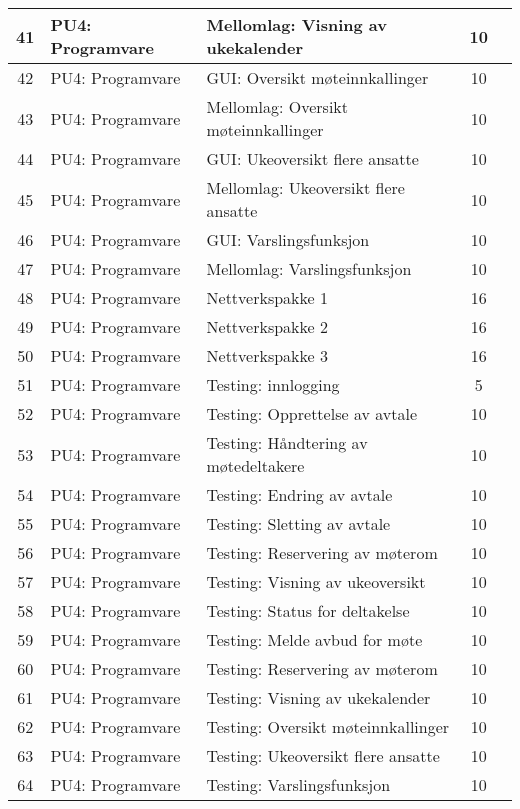 \begin{table}
{\begin{tabularx}{1.3\textwidth}{|c|l|X|c|c|}
	41 & PU4: Programvare & Mellomlag: Visning av ukekalender  & 10 & \\ \hline
	42 & PU4: Programvare & GUI: Oversikt møteinnkallinger & 10 & \\ \hline
	43 & PU4: Programvare & Mellomlag: Oversikt møteinnkallinger  & 10 & \\ \hline
	44 & PU4: Programvare & GUI: Ukeoversikt flere ansatte & 10 & \\ \hline
	45 & PU4: Programvare & Mellomlag: Ukeoversikt flere ansatte  & 10 & \\ \hline
	46 & PU4: Programvare & GUI: Varslingsfunksjon & 10 & \\ \hline
	47 & PU4: Programvare & Mellomlag: Varslingsfunksjon & 10 & \\ \hline
	48 & PU4: Programvare & Nettverkspakke 1 & 16 & \\ \hline
	49 & PU4: Programvare & Nettverkspakke 2 & 16 & \\ \hline
	50 & PU4: Programvare & Nettverkspakke 3 & 16 & \\ \hline
	51 & PU4: Programvare & Testing: innlogging & 5 & \\ \hline
	52 & PU4: Programvare & Testing: Opprettelse av avtale & 10 & \\ \hline
	53 & PU4: Programvare & Testing: Håndtering av møtedeltakere & 10 & \\ \hline
	54 & PU4: Programvare & Testing: Endring av avtale & 10 & \\  \hline
	55 & PU4: Programvare & Testing: Sletting av avtale & 10 & \\ \hline
	56 & PU4: Programvare & Testing: Reservering av møterom & 10 & \\ \hline
	57 & PU4: Programvare & Testing: Visning av ukeoversikt & 10 & \\ \hline
	58 & PU4: Programvare & Testing: Status for deltakelse & 10 & \\ \hline
	59 & PU4: Programvare & Testing: Melde avbud for møte & 10 & \\ \hline
	60 & PU4: Programvare & Testing: Reservering av møterom & 10 & \\ \hline
	61 & PU4: Programvare & Testing: Visning av ukekalender & 10 & \\ \hline
	62 & PU4: Programvare & Testing: Oversikt møteinnkallinger & 10 & \\ \hline
	63 & PU4: Programvare & Testing: Ukeoversikt flere ansatte & 10 & \\ \hline
	64 & PU4: Programvare & Testing: Varslingsfunksjon & 10 & \\ \hline

\end{tabularx}}
\end{table}
